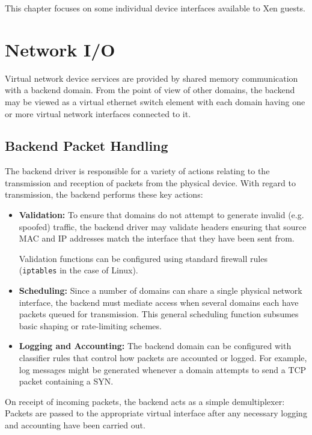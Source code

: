 \documentclass[11pt,twoside,final,openright]{report}
\begin{document}
This chapter focuses on some individual device interfaces
available to Xen guests. 

\section{Network I/O}

Virtual network device services are provided by shared memory
communication with a backend domain.  From the point of view of
other domains, the backend may be viewed as a virtual ethernet switch
element with each domain having one or more virtual network interfaces
connected to it.

\subsection{Backend Packet Handling}

The backend driver is responsible for a variety of actions relating to
the transmission and reception of packets from the physical device.
With regard to transmission, the backend performs these key actions:

\begin{itemize}
\item {\bf Validation:} To ensure that domains do not attempt to
  generate invalid (e.g. spoofed) traffic, the backend driver may
  validate headers ensuring that source MAC and IP addresses match the
  interface that they have been sent from.

  Validation functions can be configured using standard firewall rules
  ({\small{\tt iptables}} in the case of Linux).
  
\item {\bf Scheduling:} Since a number of domains can share a single
  physical network interface, the backend must mediate access when
  several domains each have packets queued for transmission.  This
  general scheduling function subsumes basic shaping or rate-limiting
  schemes.
  
\item {\bf Logging and Accounting:} The backend domain can be
  configured with classifier rules that control how packets are
  accounted or logged.  For example, log messages might be generated
  whenever a domain attempts to send a TCP packet containing a SYN.
\end{itemize}

On receipt of incoming packets, the backend acts as a simple
demultiplexer:  Packets are passed to the appropriate virtual
interface after any necessary logging and accounting have been carried
out.
\end{document}
